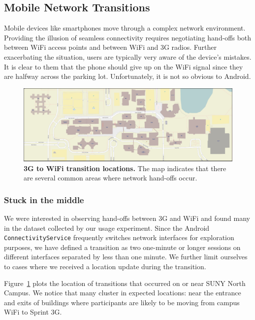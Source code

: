 \subsection{Mobile Network Transitions}
\label{subsec-networktransitions}

Mobile devices like smartphones move through a complex network environment.
Providing the illusion of seamless connectivity requires negotiating hand-offs
both between WiFi access points and between WiFi and 3G radios. Further
exacerbating the situation, users are typically very aware of the device's
mistakes. It is clear to them that the phone should give up on the WiFi
signal since they are halfway across the parking lot. Unfortunately, it is
not so obvious to Android.

\begin{figure}[t]
\includegraphics[width=\textwidth]{./figures/networking/transition_locations/graph.pdf}
\caption{\textbf{3G to WiFi transition locations.} The map indicates that
there are several common areas where network hand-offs occur.}
\label{figure-networktransitions}
\end{figure}

\subsubsection{Stuck in the middle}

We were interested in observing hand-offs between 3G and WiFi and found many
in the dataset collected by our usage experiment. Since the Android
\texttt{ConnectivityService} frequently switches network interfaces for
exploration purposes, we have defined a transition as two one-minute or
longer sessions on different interfaces separated by less than one minute. We
further limit ourselves to cases where we received a location update during
the transition.

Figure~\ref{figure-networktransitions} plots the location of transitions that
occurred on or near SUNY North Campus. We notice that many cluster in
expected locations: near the entrance and exits of buildings where
participants are likely to be moving from campus WiFi to Sprint 3G.

